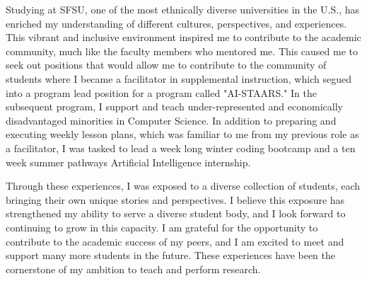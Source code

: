 \documentclass[12pt]{article}
\begin{document}
Studying at SFSU, one of the most ethnically diverse universities in the U.S., has enriched my understanding of different cultures,
perspectives, and experiences. This vibrant and inclusive environment inspired me to contribute to the academic community, much like the
faculty members who mentored me. This caused me to seek out positions that would allow me to contribute to the community of students where I
became a facilitator in supplemental instruction, which segued into a program lead position for a program called "AI-STAARS." In the
subsequent program, I support and teach under-represented and economically disadvantaged minorities in Computer Science.  In addition to
preparing and executing weekly lesson plans, which was familiar to me from my previous role as a facilitator, I was tasked to lead a week
long winter coding bootcamp and a ten week summer pathways Artificial Intelligence internship.

Through these experiences, I was exposed to a diverse collection of students, each bringing their own unique stories and perspectives. I
believe this exposure has strengthened my ability to serve a diverse student body, and I look forward to continuing to grow in this
capacity. I am grateful for the opportunity to contribute to the academic success of my peers, and I am excited to meet and support many
more students in the future. These experiences have been the cornerstone of my ambition to teach and perform research.
\end{document}
